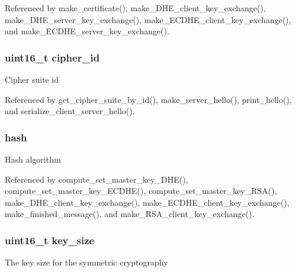 Referenced by make\+\_\+certificate(), make\+\_\+\+D\+H\+E\+\_\+client\+\_\+key\+\_\+exchange(), make\+\_\+\+D\+H\+E\+\_\+server\+\_\+key\+\_\+exchange(), make\+\_\+\+E\+C\+D\+H\+E\+\_\+client\+\_\+key\+\_\+exchange(), and make\+\_\+\+E\+C\+D\+H\+E\+\_\+server\+\_\+key\+\_\+exchange().

\subsubsection[{\texorpdfstring{cipher\+\_\+id}{cipher_id}}]{\setlength{\rightskip}{0pt plus 5cm}uint16\+\_\+t cipher\+\_\+id}\hypertarget{structcipher__suite__t_abd7eac06ec5e8b636fe8916fff6c8dfa}{}\label{structcipher__suite__t_abd7eac06ec5e8b636fe8916fff6c8dfa}
Cipher suite id 

Referenced by get\+\_\+cipher\+\_\+suite\+\_\+by\+\_\+id(), make\+\_\+server\+\_\+hello(), print\+\_\+hello(), and serialize\+\_\+client\+\_\+server\+\_\+hello().

\subsubsection[{\texorpdfstring{hash}{hash}}]{ hash}\hypertarget{structcipher__suite__t_af348e470337f3c253a2ed303577efa8e}{}\label{structcipher__suite__t_af348e470337f3c253a2ed303577efa8e}
Hash algorithm 

Referenced by compute\+\_\+set\+\_\+master\+\_\+key\+\_\+\+D\+H\+E(), compute\+\_\+set\+\_\+master\+\_\+key\+\_\+\+E\+C\+D\+H\+E(), compute\+\_\+set\+\_\+master\+\_\+key\+\_\+\+R\+S\+A(), make\+\_\+\+D\+H\+E\+\_\+client\+\_\+key\+\_\+exchange(), make\+\_\+\+E\+C\+D\+H\+E\+\_\+client\+\_\+key\+\_\+exchange(), make\+\_\+finished\+\_\+message(), and make\+\_\+\+R\+S\+A\+\_\+client\+\_\+key\+\_\+exchange().

\subsubsection[{\texorpdfstring{key\+\_\+size}{key_size}}]{\setlength{\rightskip}{0pt plus 5cm}uint16\+\_\+t key\+\_\+size}\hypertarget{structcipher__suite__t_a05d0f91f98ef3fda1cbbbdc0af1c90ca}{}\label{structcipher__suite__t_a05d0f91f98ef3fda1cbbbdc0af1c90ca}
The key size for the symmetric cryptography 
